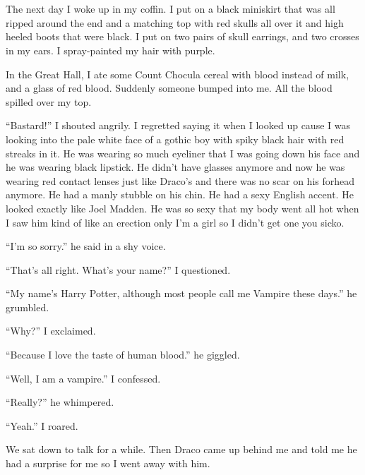 \section{}



The next day I woke up in my coffin. I put on a black miniskirt that was all ripped around the end and a matching top with red skulls all over it and high heeled boots that were black. I put on two pairs of skull earrings, and two crosses in my ears. I spray-painted my hair with purple.

\begin{sloppypar}
    In the Great Hall, I ate some Count Chocula cereal with blood instead of milk, and a glass of red blood. Suddenly someone bumped into me. All the blood spilled over my top.
\end{sloppypar}

\begin{sloppypar}
    \enquote{Bastard!} I shouted angrily. I regretted saying it when I looked up cause I was looking into the pale white face of a gothic boy with spiky black hair with red streaks in it. He was wearing so much eyeliner that I was going down his face and he was wearing black lipstick. He didn't have glasses anymore and now he was wearing red contact lenses just like Draco's and there was no scar on his forhead anymore. He had a manly stubble on his chin. He had a sexy English accent. He looked exactly like Joel Madden. He was so sexy that my body went all hot when I saw him kind of like an erection only I'm a girl so I didn't get one you sicko.
\end{sloppypar}

\enquote{I'm so sorry.} he said in a shy voice.

\enquote{That's all right. What's your name?} I questioned.

\enquote{My name's Harry Potter, although most people call me Vampire these days.} he grumbled.

\enquote{Why?} I exclaimed.

\enquote{Because I love the taste of human blood.} he giggled.

\enquote{Well, I am a vampire.} I confessed.

\enquote{Really?} he whimpered.

\enquote{Yeah.} I roared.

We sat down to talk for a while. Then Draco came up behind me and told me he had a surprise for me so I went away with him.
